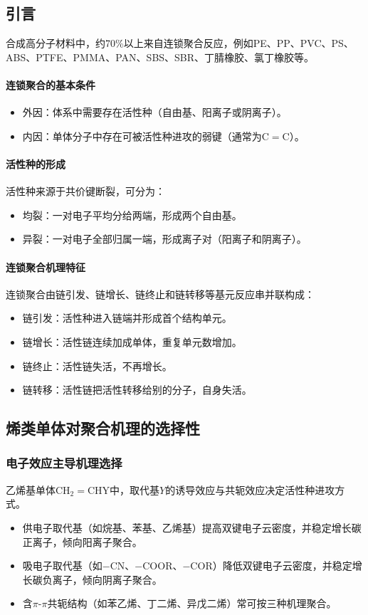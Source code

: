 ﻿\documentclass[12pt,a4paper]{article}
\begin{document}
\subsection{引言}
合成高分子材料中，约70\%以上来自连锁聚合反应，例如PE、PP、PVC、PS、ABS、PTFE、PMMA、PAN、SBS、SBR、丁腈橡胶、氯丁橡胶等。

\paragraph{连锁聚合的基本条件}
\begin{itemize}
  \item 外因：体系中需要存在活性种（自由基、阳离子或阴离子）。
  \item 内因：单体分子中存在可被活性种进攻的弱键（通常为$\mathrm{C=C}$）。
\end{itemize}

\paragraph{活性种的形成}
活性种来源于共价键断裂，可分为：
\begin{itemize}
  \item 均裂：一对电子平均分给两端，形成两个自由基。
  \item 异裂：一对电子全部归属一端，形成离子对（阳离子和阴离子）。
\end{itemize}

\paragraph{连锁聚合机理特征}
连锁聚合由链引发、链增长、链终止和链转移等基元反应串并联构成：
\begin{itemize}
  \item 链引发：活性种进入链端并形成首个结构单元。
  \item 链增长：活性链连续加成单体，重复单元数增加。
  \item 链终止：活性链失活，不再增长。
  \item 链转移：活性链把活性转移给别的分子，自身失活。
\end{itemize}

\subsection{烯类单体对聚合机理的选择性}
\subsubsection{电子效应主导机理选择}
乙烯基单体$\mathrm{CH_2=CHY}$中，取代基$Y$的诱导效应与共轭效应决定活性种进攻方式。
\begin{itemize}
  \item 供电子取代基（如烷基、苯基、乙烯基）提高双键电子云密度，并稳定增长碳正离子，倾向阳离子聚合。
  \item 吸电子取代基（如$-\mathrm{CN}$、$-\mathrm{COOR}$、$-\mathrm{COR}$）降低双键电子云密度，并稳定增长碳负离子，倾向阴离子聚合。
  \item 含$\pi$-$\pi$共轭结构（如苯乙烯、丁二烯、异戊二烯）常可按三种机理聚合。
\end{itemize}
\end{document}
